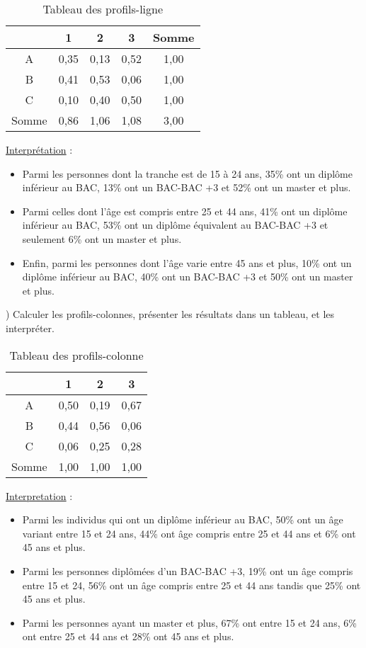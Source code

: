 \begin{table}[htbp]
	\centering
	\begin{tabular}{c|c|c|c|c}
		\cline{2-5}
		& 1      & 2      & 3      & Somme \\ \hline
		A      & 0,35   & 0,13   & 0,52   & 1,00 \\ \hline
		B      & 0,41   & 0,53   & 0,06   & 1,00 \\ \hline
		C      & 0,10   & 0,40   & 0,50   & 1,00 \\ \hline
		Somme  & 0,86   & 1,06   & 1,08   & 3,00 \\ \hline
	\end{tabular}%
	\caption{Tableau des profils-ligne}
\end{table}%

\noindent \underline{Interprétation} : 
\begin{itemize}
	\item  Parmi les personnes dont la tranche est de 15 à 24 ans, 35\% ont un diplôme inférieur au BAC, 13\% ont un BAC-BAC +3 et 52\% ont un master et plus.
	\item Parmi celles dont l'âge est compris entre 25 et 44 ans, 41\% ont un diplôme inférieur au BAC, 53\% ont un diplôme équivalent au BAC-BAC +3 et seulement 6\% ont un master et plus.
	\item  Enfin, parmi les personnes dont l'âge varie entre 45 ans et plus, 10\% ont un diplôme inférieur au BAC, 40\% ont un BAC-BAC +3 et 50\% ont un master et plus.
\end{itemize}
	) Calculer les profils-colonnes, présenter les résultats dans un tableau, et les interpréter.
	
\begin{table}[htbp]
	\centering
	\begin{tabular}{c|c|c|c}
		\cline{2-4}
		& 1      & 2      & 3 \\ \hline
		A      & 0,50   & 0,19   & 0,67 \\ \hline
		B      & 0,44   & 0,56   & 0,06 \\ \hline
		C      & 0,06   & 0,25   & 0,28 \\ \hline
		Somme  & 1,00   & 1,00   & 1,00 \\ \hline
	\end{tabular}%
	\caption{Tableau des profils-colonne}
\end{table}%

\noindent \underline{Interpretation} :
\begin{itemize}
	\item Parmi les individus qui ont un diplôme inférieur au BAC, 50\% ont un âge variant entre 15 et 24 ans, 44\% ont âge compris entre 25 et 44 ans et 6\% ont 45 ans et plus.
	\item Parmi les personnes diplômées d'un BAC-BAC +3, 19\% ont un âge compris entre 15 et 24, 56\% ont un âge compris entre 25 et 44 ans tandis que 25\% ont 45 ans et plus.
	\item Parmi les personnes ayant un master et plus, 67\% ont entre 15 et 24 ans, 6\% ont entre 25 et 44 ans et 28\% ont 45 ans et plus.
\end{itemize}
	
